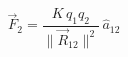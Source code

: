 \documentclass[preview]{standalone}
\begin{document}
\begin{align*}
\vec{F}_2 = \dfrac{K \, q_1 q_2}{\lVert \vec{R}_{12} \rVert^2} \, \hat{a}_{12}
\end{align*}
\end{document}
